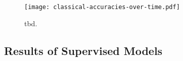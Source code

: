 \begin{figure}[ht]
    \centering
    \texttt{[image: classical-accuracies-over-time.pdf]}
    \caption[tbd]{tbd.}
    \label{fig:classical-accuracies-over-time}
\end{figure}

\subsection{Results of Supervised
    Models}\label{sec:results-of-supervised-models}

